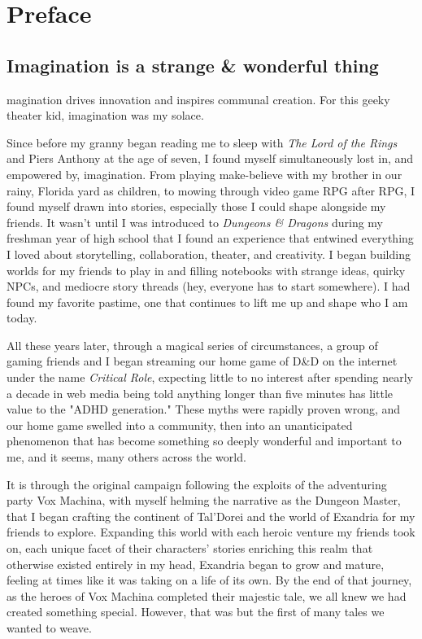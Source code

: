 \documentclass[10pt,a4paper,twoside,bg=print,twocolumn,openany,nodeprecatedcode]{dndbook}
\begin{document}
\tableofcontents
\newpage
\chapter{Preface}
\section{Imagination is a strange \& wonderful thing}
\begin{DndReadAloud}{}
magination drives innovation and inspires communal creation. For this geeky theater kid, imagination was my solace.


Since before my granny began reading me to sleep with \textit{The Lord of the Rings} and Piers Anthony at the age of seven, I found myself simultaneously lost in, and empowered by, imagination. From playing make-believe with my brother in our rainy, Florida yard as children, to mowing through video game RPG after RPG, I found myself drawn into stories, especially those I could shape alongside my friends. It wasn't until I was introduced to \textit{Dungeons \& Dragons} during my freshman year of high school that I found an experience that entwined everything I loved about storytelling, collaboration, theater, and creativity. I began building worlds for my friends to play in and filling notebooks with strange ideas, quirky NPCs, and mediocre story threads (hey, everyone has to start somewhere). I had found my favorite pastime, one that continues to lift me up and shape who I am today.

All these years later, through a magical series of circumstances, a group of gaming friends and I began streaming our home game of D\&D on the internet under the name \textit{Critical Role}, expecting little to no interest after spending nearly a decade in web media being told anything longer than five minutes has little value to the "ADHD generation." These myths were rapidly proven wrong, and our home game swelled into a community, then into an unanticipated phenomenon that has become something so deeply wonderful and important to me, and it seems, many others across the world.

It is through the original campaign following the exploits of the adventuring party Vox Machina, with myself helming the narrative as the Dungeon Master, that I began crafting the continent of Tal'Dorei and the world of Exandria for my friends to explore. Expanding this world with each heroic venture my friends took on, each unique facet of their characters' stories enriching this realm that otherwise existed entirely in my head, Exandria began to grow and mature, feeling at times like it was taking on a life of its own. By the end of that journey, as the heroes of Vox Machina completed their majestic tale, we all knew we had created something special. However, that was but the first of many tales we wanted to weave.


\end{DndReadAloud}
\end{document}

